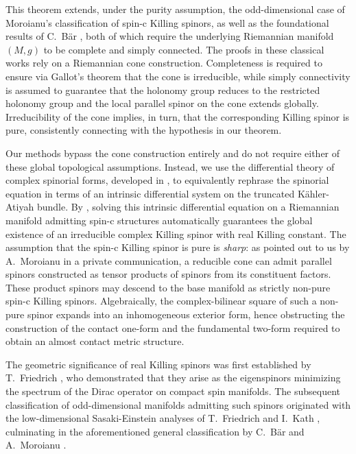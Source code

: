 \documentclass[10pt,a4paper,twoside,reqno]{amsart}
\theoremstyle{plain}
\theoremstyle{definition}
\theoremstyle{remark}
\begin{document}
This theorem extends, under the purity assumption, the odd-dimensional case of Moroianu's classification \cite[Thm.\ 4.1]{Moroianu1997} of spin-c Killing spinors, as well as the foundational results of C.\ B\"ar \cite{Bar93}, both of which require the underlying Riemannian manifold $(M,g)$ to be complete and simply connected. The proofs in these classical works rely on a Riemannian cone construction. Completeness is required to ensure via Gallot's theorem \cite{Gallot1979} that the cone is irreducible, while simply connectivity is assumed to guarantee that the holonomy group reduces to the restricted holonomy group and the local parallel spinor on the cone extends globally. Irreducibility of the cone implies, in turn, that the corresponding Killing spinor is pure, consistently connecting with the hypothesis in our theorem.\medskip

Our methods bypass the cone construction entirely and do not require either of these global topological assumptions. Instead, we use the differential theory of complex spinorial forms, developed in \cite{Algebraic_Complex_Square_2025,Complex_Differential_Spinors_2026}, to equivalently rephrase the spinorial equation in terms of an intrinsic differential system on the truncated K\"ahler-Atiyah bundle. By \cite[Thm.\ 5.10]{Complex_Differential_Spinors_2026}, solving this intrinsic differential equation on a Riemannian manifold admitting spin-c structures automatically guarantees the global existence of an irreducible complex Killing spinor with real Killing constant. The assumption that the spin-c Killing spinor is pure is \emph{sharp}: as pointed out to us by A.\ Moroianu in a private communication, a reducible cone can admit parallel spinors constructed as tensor products of spinors from its constituent factors. These product spinors may descend to the base manifold as strictly non-pure spin-c Killing spinors. Algebraically, the complex-bilinear square of such a non-pure spinor expands into an inhomogeneous exterior form, hence obstructing the construction of the contact one-form and the fundamental two-form required to obtain an almost contact metric structure.\medskip

The geometric significance of real Killing spinors was first established by T.\ Friedrich \cite{Friedrich1980}, who demonstrated that they arise as the eigenspinors minimizing the spectrum of the Dirac operator on compact spin manifolds. The subsequent classification of odd-dimensional manifolds admitting such spinors originated with the low-dimensional Sasaki-Einstein analyses of T.\ Friedrich and I.\ Kath \cite{FriedrichKath1989, FriedrichKath1990}, culminating in the aforementioned general classification by C.\ B\"ar and A.\ Moroianu \cite{Bar93,Moroianu1997}.\medskip
\end{document}
